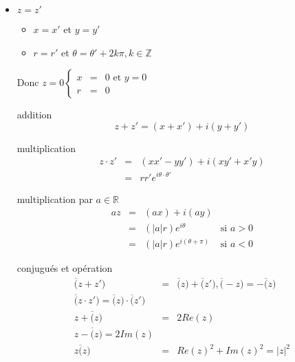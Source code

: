 \begin{itemize}
	\item $z = z'$
		\begin{itemize}
			\item $x = x'$ et $y=y'$
			\item $r=r'$ et $\theta = \theta' + 2k\pi, k \in \mathbb{Z}$
		\end{itemize}
	Donc $z=0 \left\{ \begin{array}{rcl}
					x &=& 0 \text{ et } y = 0\\
					r &=& 0\end{array}\right.$
	
	\item[addition] \[z+z' = (x+x') + i(y+y')\]
	\item[multiplication] \[\begin{array}{rcl}
		z\cdot z' &=& (xx' - yy') + i(xy'+x'y) \\
&=& rr'e^{i\theta \cdot \theta'}\end{array}\]

	\item[multiplication par $a \in \mathbb{R}$]
		\[\begin{array}{rclr}
			az &=& (ax) + i(ay) \\
&=& (|a|r)e^{i\theta} & \text{si } a > 0 \\
&=& (|a|r)e^{i(\theta + \pi)} & \text{si } a < 0 \end{array}\]

	\item[conjugués et opération]
		\[\begin{array}{rcl}
				\overline(z+z') &=& \overline(z) + \overline(z') , \overline(-z) = -\overline(z) \\
				\overline(z\cdot z') = \overline(z) \cdot \overline(z') \\
				z+\overline(z) &=& 2Re(z) \\
				z - \overline(z) = 2 Im(z) \\
		z\overline(z) &=& Re(z)^2 + Im(z)^2 = |z|^2\end{array}\]
\end{itemize}
